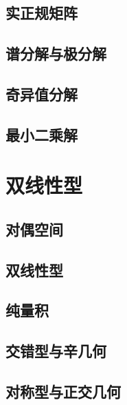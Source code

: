 \documentclass[UTF8,12pt,a4paper,fontset=fandol]{ctexbook}
\begin{document}
\section{实正规矩阵}

\section{谱分解与极分解}

\section{奇异值分解}

\section{最小二乘解}


\chapter{双线性型}

\section{对偶空间}

\section{双线性型}

\section{纯量积}

\section{交错型与辛几何}

\section{对称型与正交几何}
\end{document}
